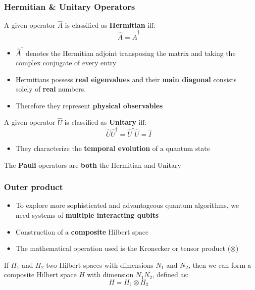 \documentclass{beamer}
\begin{document}
\begin{frame}
	\frametitle{Hermitian \& Unitary Operators}
	A given operator $\hat{A}$ is classified as \textbf{Hermitian} iff:
	\begin{equation}
		\hat{A} = \hat{A}^\dagger
		\label{eq:matrix_A_dagger}
	\end{equation}
	\begin{itemize}
		\item $\hat{A}^\dagger$ denotes the Hermitian adjoint \textrightarrow transposing the matrix and taking the complex conjugate of every entry
		\item Hermitians possess \textbf{real eigenvalues} and their \textbf{main diagonal} consists solely of \textbf{real} numbers.
		\item Therefore they represent \textbf{physical observables}
	\end{itemize}
	
	A given operator $\hat{U}$ is classified as \textbf{Unitary} iff:
	\begin{equation}
	\hat{U}\hat{U}^\dagger =\hat{U}^\dagger\hat{U} = \hat{I}
	\label{eq:matrix_U_dagger}
	\end{equation}
	\begin{itemize}
		\item They characterize the \textbf{temporal evolution} of a quantum state
	\end{itemize}
	The \textbf{Pauli} operators are \textbf{both} the Hermitian and Unitary

\end{frame}

\begin{frame}
	\frametitle{Outer product}
	\begin{itemize}
		\item To explore more sophisticated and advantageous quantum algorithms, we need systems of \textbf{multiple interacting qubits}
		\item Construction of a \textbf{composite} Hilbert space
		\item The mathematical operation used is the Kronecker or tensor product ($\otimes$)
	\end{itemize}
	
	If $H_1$ and $H_2$ two Hilbert spaces with dimensions $N_1$ and $N_2$, then we can form a composite Hilbert space $H$ with dimension $N_1N_2$, defined as:
	\begin{equation}
		H = H_1 \otimes H_2
		\label{eq:tensor}
	\end{equation}

\end{frame}
\end{document}
